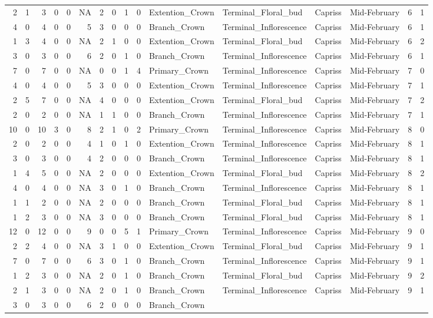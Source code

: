 \documentclass[]{article}
\begin{document}
\begin{longtable}[]{@{}rrrrrrrrrrllllrl@{}}
2 & 1 & 3 & 0 & 0 & NA & 2 & 0 & 1 & 0 & Extention\_Crown &
Terminal\_Floral\_bud & Capriss & Mid-February & 6 & 1\tabularnewline
4 & 0 & 4 & 0 & 0 & 5 & 3 & 0 & 0 & 0 & Branch\_Crown &
Terminal\_Inflorescence & Capriss & Mid-February & 6 & 1\tabularnewline
1 & 3 & 4 & 0 & 0 & NA & 2 & 1 & 0 & 0 & Extention\_Crown &
Terminal\_Floral\_bud & Capriss & Mid-February & 6 & 2\tabularnewline
3 & 0 & 3 & 0 & 0 & 6 & 2 & 0 & 1 & 0 & Branch\_Crown &
Terminal\_Inflorescence & Capriss & Mid-February & 6 & 1\tabularnewline
7 & 0 & 7 & 0 & 0 & NA & 0 & 0 & 1 & 4 & Primary\_Crown &
Terminal\_Inflorescence & Capriss & Mid-February & 7 & 0\tabularnewline
4 & 0 & 4 & 0 & 0 & 5 & 3 & 0 & 0 & 0 & Extention\_Crown &
Terminal\_Inflorescence & Capriss & Mid-February & 7 & 1\tabularnewline
2 & 5 & 7 & 0 & 0 & NA & 4 & 0 & 0 & 0 & Extention\_Crown &
Terminal\_Floral\_bud & Capriss & Mid-February & 7 & 2\tabularnewline
2 & 0 & 2 & 0 & 0 & NA & 1 & 1 & 0 & 0 & Branch\_Crown &
Terminal\_Inflorescence & Capriss & Mid-February & 7 & 1\tabularnewline
10 & 0 & 10 & 3 & 0 & 8 & 2 & 1 & 0 & 2 & Primary\_Crown &
Terminal\_Inflorescence & Capriss & Mid-February & 8 & 0\tabularnewline
2 & 0 & 2 & 0 & 0 & 4 & 1 & 0 & 1 & 0 & Extention\_Crown &
Terminal\_Inflorescence & Capriss & Mid-February & 8 & 1\tabularnewline
3 & 0 & 3 & 0 & 0 & 4 & 2 & 0 & 0 & 0 & Branch\_Crown &
Terminal\_Inflorescence & Capriss & Mid-February & 8 & 1\tabularnewline
1 & 4 & 5 & 0 & 0 & NA & 2 & 0 & 0 & 0 & Extention\_Crown &
Terminal\_Floral\_bud & Capriss & Mid-February & 8 & 2\tabularnewline
4 & 0 & 4 & 0 & 0 & NA & 3 & 0 & 1 & 0 & Branch\_Crown &
Terminal\_Inflorescence & Capriss & Mid-February & 8 & 1\tabularnewline
1 & 1 & 2 & 0 & 0 & NA & 2 & 0 & 0 & 0 & Branch\_Crown &
Terminal\_Floral\_bud & Capriss & Mid-February & 8 & 1\tabularnewline
1 & 2 & 3 & 0 & 0 & NA & 3 & 0 & 0 & 0 & Branch\_Crown &
Terminal\_Floral\_bud & Capriss & Mid-February & 8 & 1\tabularnewline
12 & 0 & 12 & 0 & 0 & 9 & 0 & 0 & 5 & 1 & Primary\_Crown &
Terminal\_Inflorescence & Capriss & Mid-February & 9 & 0\tabularnewline
2 & 2 & 4 & 0 & 0 & NA & 3 & 1 & 0 & 0 & Extention\_Crown &
Terminal\_Floral\_bud & Capriss & Mid-February & 9 & 1\tabularnewline
7 & 0 & 7 & 0 & 0 & 6 & 3 & 0 & 1 & 0 & Branch\_Crown &
Terminal\_Inflorescence & Capriss & Mid-February & 9 & 1\tabularnewline
1 & 2 & 3 & 0 & 0 & NA & 2 & 0 & 1 & 0 & Branch\_Crown &
Terminal\_Floral\_bud & Capriss & Mid-February & 9 & 2\tabularnewline
2 & 1 & 3 & 0 & 0 & NA & 2 & 0 & 1 & 0 & Branch\_Crown &
Terminal\_Inflorescence & Capriss & Mid-February & 9 & 1\tabularnewline
3 & 0 & 3 & 0 & 0 & 6 & 2 & 0 & 0 & 0 & Branch\_Crown &

\end{longtable}
\end{document}
